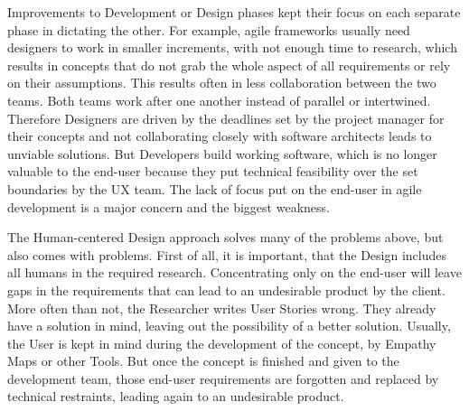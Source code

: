 {Improvements to Development or Design phases kept their focus on each separate phase in dictating the other\cite[p. 22]{ratcliffe2011agile}. For example, agile frameworks usually need designers to work in smaller increments\citep{Theartof49:online}, with not enough time to research, which results in concepts that do not grab the whole aspect of all requirements or rely on their assumptions\citep{HowtoCom22:online}. This results often in less collaboration between the two teams\cite[p. iv]{ratcliffe2011agile}\cite[p. 115]{Bringing52:online}. Both teams work after one another instead of parallel or intertwined\cite[p. 9]{Forbrig2015ManagingTA}. Therefore Designers are driven by the deadlines set by the project manager for their concepts and not collaborating closely with software architects leads to unviable solutions\cite[p. 4]{ratcliffe2011agile}. But Developers build working software, which is no longer valuable to the end-user because they put technical feasibility over the set boundaries by the UX team. The lack of focus put on the end-user in agile development is a major concern and the biggest weakness\cite[p. 312]{Humancom0:online}.

The Human-centered Design approach solves many of the problems above, but also comes with problems. First of all, it is important, that the Design includes all humans in the required research. Concentrating only on the end-user will leave gaps in the requirements that can lead to an undesirable product by the client. More often than not, the Researcher writes User Stories wrong\citep{userstor59:online}. They already have a solution in mind, leaving out the possibility of a better solution. Usually, the User is kept in mind during the development of the concept, by Empathy Maps or other Tools. But once the concept is finished and given to the development team, those end-user requirements are forgotten and replaced by technical restraints, leading again to an undesirable product\cite[p. 19, p. 33]{ratcliffe2011agile}.

}
